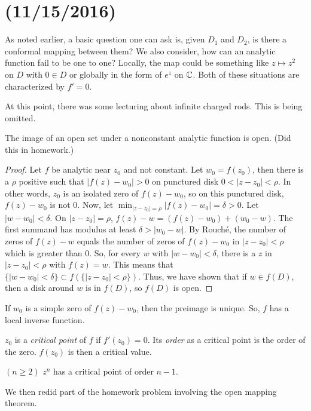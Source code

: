 \documentclass[11pt,leqno,oneside]{amsart}
\numberwithin{thm}{section}
\begin{document}
  \section{(11/15/2016)}
  As noted earlier, a basic question one can ask is, given $D_1$ and
  $D_2$, is there a conformal mapping between them? We also consider,
  how can an analytic function fail to be one to one? Locally, the map
  could be something like $z \mapsto z^2$ on $D$ with $0 \in D$ or
  globally in the form of $e^z$ on ${\mathbb C}$. Both of these situations are
  characterized by $f' = 0$.

  At this point, there was some lecturing about infinite charged
  rods. This is being omitted.

  \begin{thm}
    The image of an open set under a nonconstant analytic function is open. (Did
    this in homework.)
  \end{thm}
  \begin{proof}
    Let $f$ be analytic near $z_0$ and not constant. Let $w_0 =
    f(z_0)$, then there is a $\rho$ positive such that $|f(z)-w_0| >
    0$ on punctured disk $0 < |z-z_0| < \rho$. In other words, $z_0$
    is an isolated zero of $f(z)-w_0$, so on this punctured disk,
    $f(z)-w_0$ is not 0. Now, let $\min_{|z-z_0|=\rho} |f(z)-w_0| =
    \delta > 0$. Let $|w-w_0| < \delta$. On $|z-z_0| = \rho$, $f(z)-w
    = (f(z)-w_0) + (w_0-w)$. The first summand has modulus at least
    $\delta > |w_0-w|$. By Rouch\'{e}, the number of zeros of $f(z)-w$
    equals the number of zeros of $f(z)-w_0$ in $|z-z_0| < \rho$ which
    is greater than 0. So, for every $w$ with $|w-w_0| < \delta$,
    there is a $z$ in $|z-z_0| < \rho$ with $f(z) = w$. This means
    that $\{|w-w_0| < \delta\} \subset f(\{|z-z_0| < \rho\})$. Thus,
    we have shown that if $w \in f(D)$, then a disk around $w$ is in
    $f(D)$, so $f(D)$ is open.
  \end{proof}
  If $w_0$ is a simple zero of $f(z)-w_0$, then the preimage is
  unique. So, $f$ has a local inverse function.
  \begin{defn}
    $z_0$ is a \emph{critical point} of $f$ if $f'(z_0) = 0$. Its
    \emph{order} as a critical point is the order of the
    zero. $f(z_0)$ is then a critical value.
  \end{defn}
  \begin{example}
    $(n \geq 2)$ $z^n$ has a critical point of order $n-1$.
  \end{example}
  We then redid part of the homework problem involving the open
  mapping theorem.
\end{document}

